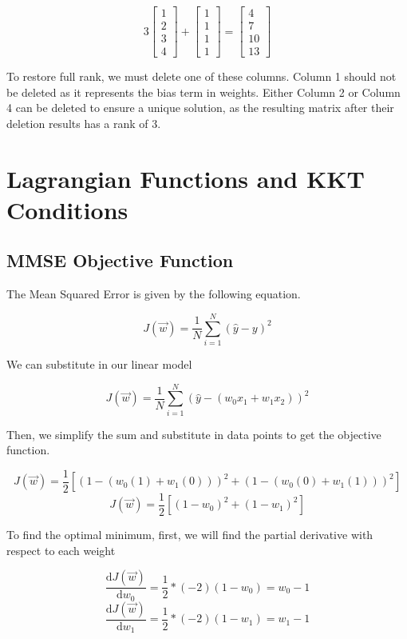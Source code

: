 \documentclass{article}
\begin{document}
\[3 \begin{bmatrix}
    1 \\
    2 \\
    3 \\
    4 
\end{bmatrix} + \begin{bmatrix}
    1 \\
    1 \\
    1 \\
    1 
\end{bmatrix} = 
\begin{bmatrix}
    4 \\
    7 \\
    10 \\
    13
\end{bmatrix}
\]

\noindent
To restore full rank, we must delete one of these columns. Column 1 should not be deleted as it represents the bias term in weights. Either Column 2 or Column 4 can be deleted to ensure a unique solution, as the resulting matrix after their deletion results has a rank of 3.

\section{Lagrangian Functions and KKT Conditions}
\subsection{MMSE Objective Function}

The Mean Squared Error is given by the following equation.

\[J(\Vec{w}) = \frac{1}{N} \sum^N_{i=1}(\hat{y} - y)^2\]

We can substitute in our linear model

\[J(\Vec{w}) = \frac{1}{N} \sum^N_{i=1}(\hat{y} - (w_0x_1 + w_1x_2))^2\]

Then, we simplify the sum and substitute in data points to get the objective function.

\[J(\Vec{w}) = \frac{1}{2} [(1 - (w_0(1) + w_1(0)))^2 + (1 - (w_0(0) + w_1(1)))^2]    \]
\[J(\Vec{w}) = \frac{1}{2} [(1 - w_0)^2 + (1 - w_1)^2]    \]

To find the optimal minimum, first, we will find the partial derivative with respect to each weight

\[\frac{\mathrm{d}J(\Vec{w})}{\mathrm{d}w_0} = \frac{1}{2} * (-2) (1 - w_0) = w_0 - 1 \]
\[\frac{\mathrm{d}J(\Vec{w})}{\mathrm{d}w_1} = \frac{1}{2} * (-2) (1 - w_1) = w_1 - 1 \]
\end{document}
